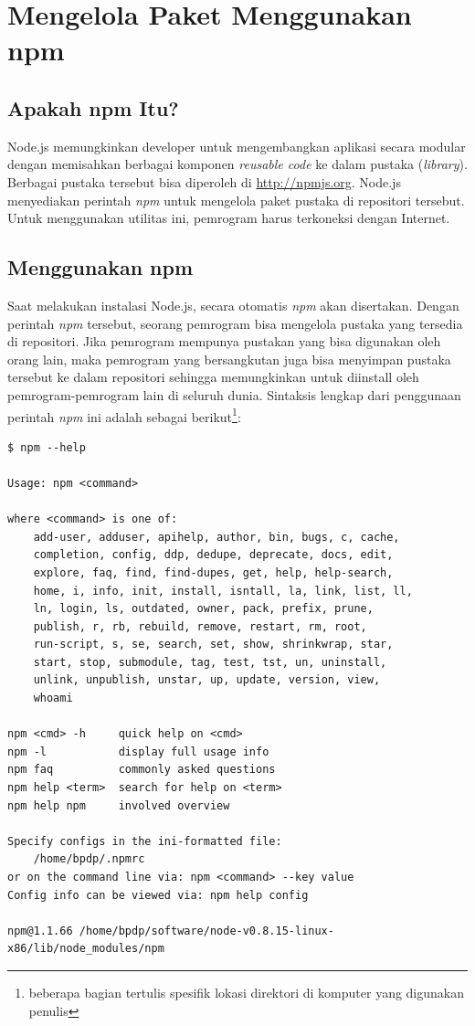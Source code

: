 \chapter{Mengelola Paket Menggunakan npm}

\section{Apakah npm Itu?}

Node.js memungkinkan developer untuk mengembangkan aplikasi secara modular dengan memisahkan berbagai komponen \textit{reusable code} ke dalam pustaka (\textit{library}). Berbagai pustaka tersebut bisa diperoleh di \url{http://npmjs.org}. Node.js menyediakan perintah \textit{npm} untuk mengelola paket pustaka di repositori tersebut. Untuk menggunakan utilitas ini, pemrogram harus terkoneksi dengan Internet.

\section{Menggunakan npm}

Saat melakukan instalasi Node.js, secara otomatis \textit{npm} akan disertakan. Dengan perintah \textit{npm} tersebut, seorang pemrogram bisa mengelola pustaka yang tersedia di repositori. Jika pemrogram mempunya pustakan yang bisa digunakan oleh orang lain, maka pemrogram yang bersangkutan juga bisa menyimpan pustaka tersebut ke dalam repositori sehingga memungkinkan untuk diinstall oleh pemrogram-pemrogram lain di seluruh dunia. Sintaksis lengkap dari penggunaan perintah \textit{npm} ini adalah sebagai berikut\footnote{beberapa bagian tertulis spesifik lokasi direktori di komputer yang digunakan penulis}:

\begin{lstlisting}
$ npm --help

Usage: npm <command>

where <command> is one of:
    add-user, adduser, apihelp, author, bin, bugs, c, cache,
    completion, config, ddp, dedupe, deprecate, docs, edit,
    explore, faq, find, find-dupes, get, help, help-search,
    home, i, info, init, install, isntall, la, link, list, ll,
    ln, login, ls, outdated, owner, pack, prefix, prune,
    publish, r, rb, rebuild, remove, restart, rm, root,
    run-script, s, se, search, set, show, shrinkwrap, star,
    start, stop, submodule, tag, test, tst, un, uninstall,
    unlink, unpublish, unstar, up, update, version, view,
    whoami

npm <cmd> -h     quick help on <cmd>
npm -l           display full usage info
npm faq          commonly asked questions
npm help <term>  search for help on <term>
npm help npm     involved overview

Specify configs in the ini-formatted file:
    /home/bpdp/.npmrc
or on the command line via: npm <command> --key value
Config info can be viewed via: npm help config

npm@1.1.66 /home/bpdp/software/node-v0.8.15-linux-x86/lib/node_modules/npm
\end{lstlisting}

